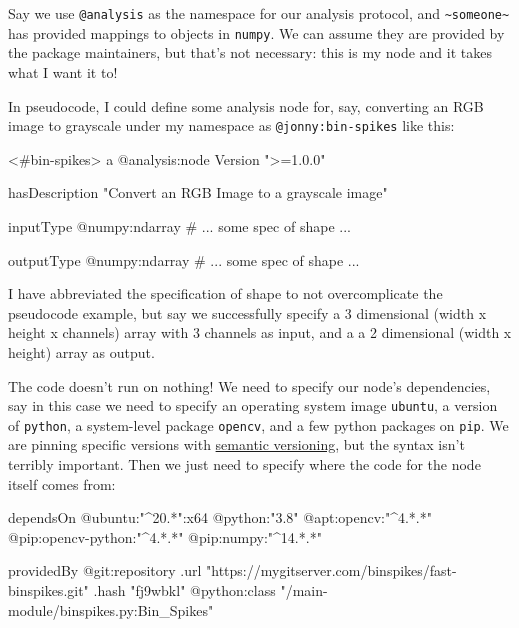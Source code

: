 \documentclass[10pt]{article}
\newenvironment{Shaded}{}{}
\newcommand{\NormalTok}[1]{#1}
\begin{document}
\begin{multicols}{2}
Say we use \texttt{@analysis} as the namespace for our analysis
protocol, and \texttt{\textasciitilde{}someone\textasciitilde{}} has
provided mappings to objects in \texttt{numpy}. We can assume they are
provided by the package maintainers, but that's not necessary: this is
my node and it takes what I want it to!

In pseudocode, I could define some analysis node for, say, converting an
RGB image to grayscale under my namespace as \texttt{@jonny:bin-spikes}
like this:

\begin{Shaded}
\begin{Highlighting}[]
\NormalTok{\textless{}\#bin{-}spikes\textgreater{}}
\NormalTok{  a @analysis:node}
\NormalTok{    Version "\textgreater{}=1.0.0"}

\NormalTok{  hasDescription}
\NormalTok{    "Convert an RGB Image to a grayscale image"}

\NormalTok{  inputType}
\NormalTok{    @numpy:ndarray}
\NormalTok{      \# ... some spec of shape ...}

\NormalTok{  outputType}
\NormalTok{    @numpy:ndarray}
\NormalTok{      \# ... some spec of shape ...}
\end{Highlighting}
\end{Shaded}

I have abbreviated the specification of shape to not overcomplicate the
pseudocode example, but say we successfully specify a 3 dimensional
(width x height x channels) array with 3 channels as input, and a a 2
dimensional (width x height) array as output.

The code doesn't run on nothing! We need to specify our node's
dependencies, say in this case we need to specify an operating system
image \texttt{ubuntu}, a version of \texttt{python}, a system-level
package \texttt{opencv}, and a few python packages on \texttt{pip}. We
are pinning specific versions with \href{https://semver.org/}{semantic
versioning}, but the syntax isn't terribly important. Then we just need
to specify where the code for the node itself comes from:

\begin{Shaded}
\begin{Highlighting}[]
\NormalTok{  dependsOn}
\NormalTok{    @ubuntu:"\^{}20.*":x64}
\NormalTok{    @python:"3.8"}
\NormalTok{    @apt:opencv:"\^{}4.*.*"}
\NormalTok{    @pip:opencv{-}python:"\^{}4.*.*"}
\NormalTok{    @pip:numpy:"\^{}14.*.*"}

\NormalTok{  providedBy}
\NormalTok{    @git:repository }
\NormalTok{      .url "https://mygitserver.com/binspikes/fast{-}binspikes.git"}
\NormalTok{      .hash "fj9wbkl"}
\NormalTok{    @python:class "/main{-}module/binspikes.py:Bin\_Spikes"}
\end{Highlighting}
\end{Shaded}


\end{multicols}
\end{document}
